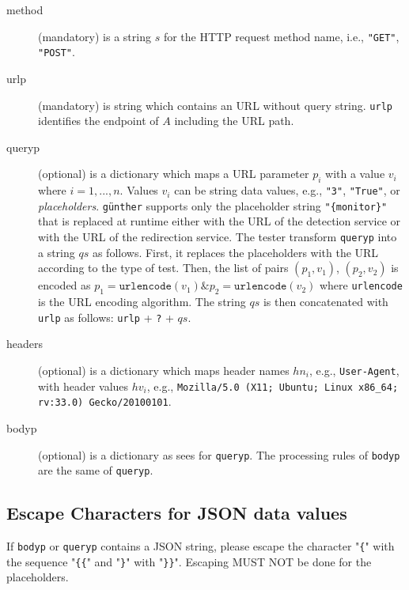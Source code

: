 \documentclass[10pt,a4paper]{article}
\newcommand{\g}{\texttt{g\"{u}nther}}
\begin{document}
\begin{description}
   
   \item[method] (mandatory) is a string $s$ for the HTTP request method
   name, i.e., \texttt{"GET"}, \texttt{"POST"}.
   
   \item[urlp] (mandatory) is string which contains an URL without query string.
   \texttt{urlp} identifies the endpoint of $A$ including the URL path.
   
   \item[queryp] (optional) is a dictionary which maps a URL parameter $p_i$
   with a value $v_i$ where $i=1, ..., n$. Values $v_i$ can be string data
   values, e.g., \texttt{"3"}, \texttt{"True"}, or \emph{placeholders}. \g{}
   supports only the placeholder string \texttt{"\{monitor\}"} that is replaced
   at runtime either with the URL of the detection service or with the URL of
   the redirection service. The tester transform \texttt{queryp} into a string
   $qs$ as follows. First, it replaces the placeholders with the URL according
   to the type of test. Then, the list of pairs $(p_1, v_1)$, $(p_2, v_2)$ is
   encoded as $p_1=\mathtt{urlencode}(v_1)\&p_2=\mathtt{urlencode}(v_2)$ where
   \texttt{urlencode} is the URL encoding algorithm. The string $qs$ is then
   concatenated with \texttt{urlp} as follows: \texttt{urlp} + \texttt{?} +
   $qs$.

   \item[headers] (optional) is a dictionary which maps header names $hn _i$, e.g.,
   \texttt{User-Agent}, with header values $hv_i$, e.g., \texttt{Mozilla/5.0
   (X11; Ubuntu; Linux x86\_64; rv:33.0) Gecko/20100101}.
   
   \item[bodyp] (optional) is a dictionary as sees for  \texttt{queryp}. The
   processing rules of \texttt{bodyp} are the same of \texttt{queryp}.

\end{description}

\subsection*{Escape Characters for JSON data values}

If \texttt{bodyp} or \texttt{queryp} contains a JSON string, please escape the character "\texttt{\{}" with the sequence "\texttt{\{\{}" and "\texttt{\}}" with "\texttt{\}\}}". Escaping MUST NOT be done for the placeholders.
\end{document}
